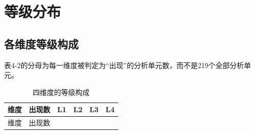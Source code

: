 \documentclass[
  12pt,
  a4paper]{ctexbook}
\begin{document}
\section{等级分布}\label{ux7b49ux7ea7ux5206ux5e03}

\subsection{各维度等级构成}\label{ux5404ux7ef4ux5ea6ux7b49ux7ea7ux6784ux6210}

表4-2的分母为每一维度被判定为``出现''的分析单元数，而不是219个全部分析单元。

\begin{longtable}[]{@{}
  >{\raggedright\arraybackslash}p{}
  >{\raggedleft\arraybackslash}p{}
  >{\raggedleft\arraybackslash}p{}
  >{\raggedleft\arraybackslash}p{}
  >{\raggedleft\arraybackslash}p{}
  >{\raggedleft\arraybackslash}p{}@{}}
\caption{四维度的等级构成}\tabularnewline
\toprule\noalign{}
\rowcolor{ThesisPale}
\begin{minipage}[b]{\linewidth}\raggedright
维度
\end{minipage} & \begin{minipage}[b]{\linewidth}\raggedleft
出现数
\end{minipage} & \begin{minipage}[b]{\linewidth}\raggedleft
L1
\end{minipage} & \begin{minipage}[b]{\linewidth}\raggedleft
L2
\end{minipage} & \begin{minipage}[b]{\linewidth}\raggedleft
L3
\end{minipage} & \begin{minipage}[b]{\linewidth}\raggedleft
L4
\end{minipage} \\
\midrule\noalign{}
\endfirsthead
\toprule\noalign{}
\rowcolor{ThesisPale}
\begin{minipage}[b]{\linewidth}\raggedright
维度
\end{minipage} & \begin{minipage}[b]{\linewidth}\raggedleft
出现数
\end{minipage} & \begin{minipage}[b]{\linewidth}\raggedleft

\end{minipage}
\end{longtable}
\end{document}
